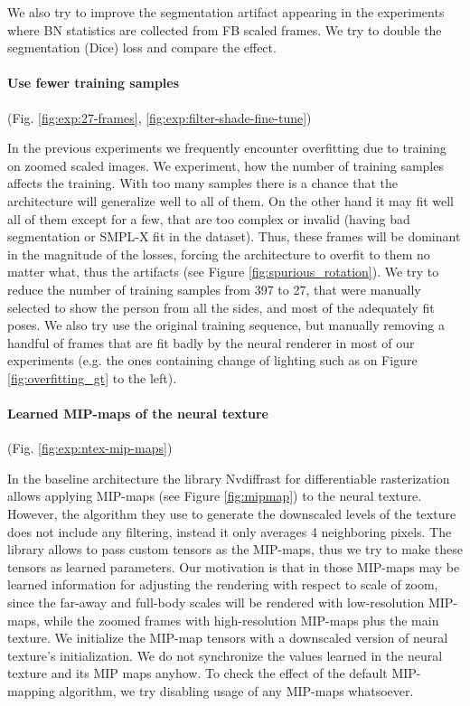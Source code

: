We also try to improve the segmentation artifact appearing in the experiments where BN statistics are collected from FB scaled frames. We try to double the segmentation (Dice) loss and compare the effect.

\vspace{-15pt}\paragraph{Use fewer training samples}(Fig. \ref{fig:exp:27-frames}, \ref{fig:exp:filter-shade-fine-tune})\mbox{}\nopagebreak

In the previous experiments we frequently encounter overfitting due to training on zoomed scaled images. We experiment, how the number of training samples affects the training. With too many samples there is a chance that the architecture will generalize well to all of them. On the other hand it may fit well all of them except for a few, that are too complex or invalid (having bad segmentation or SMPL-X fit in the dataset). Thus, these frames will be dominant in the magnitude of the losses, forcing the architecture to overfit to them no matter what, thus the artifacts (see Figure \ref{fig:spurious_rotation}). We try to reduce the number of training samples from 397 to 27, that were manually selected to show the person from all the sides, and most of the adequately fit poses. We also try use the original training sequence, but manually removing a handful of frames that are fit badly by the neural renderer in most of our experiments (e.g. the ones containing change of lighting such as on Figure \ref{fig:overfitting_gt} to the left).

\vspace{-15pt}\paragraph{Learned MIP-maps of the neural texture}(Fig. \ref{fig:exp:ntex-mip-maps})\mbox{}\nopagebreak

In the baseline architecture the library Nvdiffrast \cite{aux:nvdiffrast20} for differentiable rasterization allows applying MIP-maps (see Figure \ref{fig:mipmap}) to the neural texture. However, the algorithm they use to generate the downscaled levels of the texture does not include any filtering, instead it only averages 4 neighboring pixels. The library allows to pass custom tensors as the MIP-maps, thus we try to make these tensors as learned parameters. Our motivation is that in those MIP-maps may be learned information for adjusting the rendering with respect to scale of zoom, since the far-away and full-body scales will be rendered with low-resolution MIP-maps, while the zoomed frames with high-resolution MIP-maps plus the main texture. We initialize the MIP-map tensors with a downscaled version of neural texture's initialization. We do not synchronize the values learned in the neural texture and its MIP maps anyhow. To check the effect of the default MIP-mapping algorithm, we try disabling usage of any MIP-maps whatsoever.

